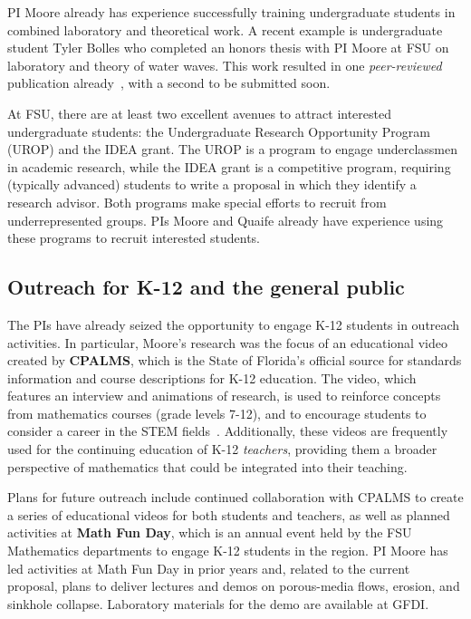 \documentclass[11pt]{article}
\begin{document}
PI Moore already has experience successfully training undergraduate students in combined laboratory and theoretical work. A recent example is undergraduate student Tyler Bolles who completed an honors thesis with PI Moore at FSU on laboratory and theory of water waves. This work resulted in one {\em peer-reviewed} publication already~\cite{Bolles2019}, with a second to be submitted soon.

At FSU, there are at least two excellent avenues to attract interested undergraduate students:  the Undergraduate Research Opportunity Program (UROP) and the IDEA grant. The UROP is a program to engage underclassmen in academic research, while the IDEA grant is a competitive program, requiring (typically advanced) students to write a proposal in which they identify a research advisor. Both programs make special efforts to recruit from underrepresented groups. PIs Moore and Quaife already have experience using these programs to recruit interested students.

\subsection{Outreach for K-12 and the general public}

The PIs have already seized the opportunity to engage K-12 students in outreach activities. In particular, Moore's research was the focus of an educational video created by {\bf CPALMS}, which is the State of Florida's official source for standards information and course descriptions for K-12 education. The video, which features an interview and animations of research, is used to reinforce concepts from mathematics courses (grade levels 7-12), and to encourage students to consider a career in the STEM fields~\cite{CPALMS}. Additionally, these videos are frequently used for the continuing education of K-12 {\em teachers}, providing them a broader perspective of mathematics that could be integrated into their teaching.
 
Plans for future outreach include continued collaboration with CPALMS to create a series of educational videos for both students and teachers, as well as planned activities at {\bf Math Fun Day}, which is an annual event held by the FSU Mathematics departments to engage K-12 students in the region. PI Moore has led activities at Math Fun Day in prior years and, related to the current proposal, plans to deliver lectures and demos on porous-media flows, erosion, and sinkhole collapse. Laboratory materials for the demo are available at GFDI.
\end{document}
